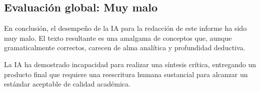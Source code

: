 \documentclass{article}
\begin{document}
\subsection{Evaluación global: Muy malo}
En conclusión, el desempeño de la IA para la redacción de este informe ha sido muy malo. El texto resultante es una amalgama de conceptos que, aunque gramaticalmente correctos, carecen de alma analítica y profundidad deductiva.

La IA ha demostrado incapacidad para realizar una síntesis crítica, entregando un producto final que requiere una reescritura humana sustancial para alcanzar un estándar aceptable de calidad académica.
\end{document}
